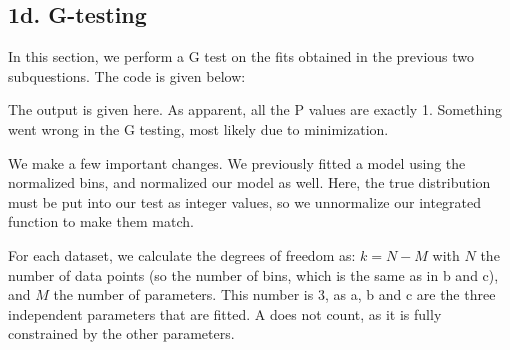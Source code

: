 \subsection{1d. G-testing}
In this section, we perform a G test on the fits obtained in the previous two subquestions. The code is given below:



The output is given here. As apparent, all the P values are exactly 1. Something went wrong in the G testing, most likely due to minimization.



We make a few important changes. We previously fitted a model using the normalized bins, and normalized our model as well. Here, the true distribution must be put into our test as integer values, so we unnormalize our integrated function to make them match.

For each dataset, we calculate the degrees of freedom as: $k = N - M$ with $N$ the number of data points (so the number of bins, which is the same as in b and c), and $M$ the number of parameters. This number is 3, as a, b and c are the three independent parameters that are fitted. A does not count, as it is fully constrained by the other parameters.









